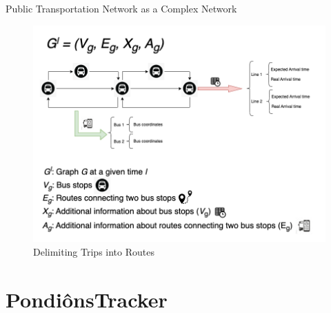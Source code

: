 \documentclass[xcolor=dvipsnames,table]{beamer}
\begin{document}
\begin{frame}{Public Transportation Network as a Complex Network}
        \begin{figure}[H]
                \centering
                \includegraphics[scale=0.3]{images/final_graph.png}
                \caption{Delimiting Trips into Routes}
        \end{figure}
\end{frame}



\section{PondiônsTracker}
\end{document}
